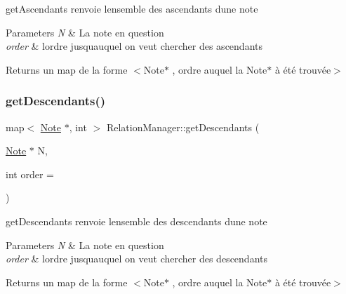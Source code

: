 get\+Ascendants renvoie l\textquotesingle{}ensemble des ascendants d\textquotesingle{}une note 


\begin{DoxyParams}{Parameters}
{\em N} & La note en question \\
\hline
{\em order} & l\textquotesingle{}ordre jusqu\textquotesingle{}auquel on veut chercher des ascendants \\
\hline
\end{DoxyParams}
\begin{DoxyReturn}{Returns}
un map de la forme $<$Note$\ast$ , ordre auquel la Note$\ast$ à été trouvée$>$ 
\end{DoxyReturn}
\mbox{\label{classRelationManager_ae3a50ade39caadb752a6dc48d068eb72}} 
\subsubsection{\texorpdfstring{get\+Descendants()}{getDescendants()}}
{\footnotesize\ttfamily map$<$ \hyperlink{classNote}{Note} $\ast$, int $>$ Relation\+Manager\+::get\+Descendants (\begin{DoxyParamCaption}\item[{\hyperlink{classNote}{Note} $\ast$}]{N,  }\item[{int}]{order = {} }\end{DoxyParamCaption})\hspace{0.3cm}{\ttfamily [static]}}



get\+Descendants renvoie l\textquotesingle{}ensemble des descendants d\textquotesingle{}une note 


\begin{DoxyParams}{Parameters}
{\em N} & La note en question \\
\hline
{\em order} & l\textquotesingle{}ordre jusqu\textquotesingle{}auquel on veut chercher des descendants \\
\hline
\end{DoxyParams}
\begin{DoxyReturn}{Returns}
un map de la forme $<$Note$\ast$ , ordre auquel la Note$\ast$ à été trouvée$>$ 
\end{DoxyReturn}
\mbox{\label{classRelationManager_a82106c99bec406c5e2834992a776c739}} 
